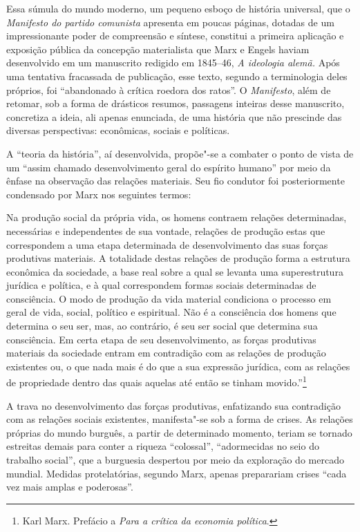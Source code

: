 Essa súmula do mundo moderno, um pequeno esboço de história universal,
que o \textit{Manifesto do partido comunista} apresenta em poucas
páginas, dotadas de um impressionante poder de compreensão e síntese,
constitui a primeira aplicação e exposição pública da concepção
materialista que Marx e Engels haviam desenvolvido em um manuscrito
redigido em 1845--46, \textit{A ideologia alemã.} Após uma tentativa
fracassada de publicação, esse texto, segundo a terminologia deles
próprios, foi “abandonado à crítica roedora dos ratos”. O
\textit{Manifesto}, além de retomar, sob a forma de drásticos resumos,
passagens inteiras desse manuscrito, concretiza a ideia, ali apenas
enunciada, de uma história que não prescinde das diversas perspectivas:
econômicas, sociais e políticas.

A “teoria da história”, aí desenvolvida, propõe"-se a combater o ponto
de vista de um “assim chamado desenvolvimento geral do espírito humano”
por meio da ênfase na observação das relações materiais. Seu fio
condutor foi posteriormente condensado por Marx nos seguintes termos: 

\begin{hedraquote} 
Na produção social da própria vida, os homens contraem relações
determinadas, necessárias e independentes de sua vontade, relações de
produção estas que correspondem a uma etapa determinada de
desenvolvimento das suas forças produtivas materiais. A totalidade
destas relações de produção forma a estrutura econômica da sociedade, a
base real sobre a qual se levanta uma superestrutura jurídica e
política, e à qual correspondem formas sociais determinadas de
consciência. O modo de produção da vida material condiciona o processo
em geral de vida, social, político e espiritual. Não é a consciência
dos homens que determina o seu ser, mas, ao contrário, é seu ser social
que determina sua consciência. Em certa etapa de seu desenvolvimento,
as forças produtivas materiais da sociedade entram em contradição com
as relações de produção existentes  ou, o que nada mais é do que a sua
expressão jurídica, com as relações de propriedade dentro das quais
aquelas até então se tinham movido.”\footnote{ Karl Marx. Prefácio a
\textit{Para a crítica da economia política}.}
\end{hedraquote} 

A trava no desenvolvimento das forças produtivas, enfatizando sua
contradição com as relações sociais existentes, manifesta"-se sob a
forma de crises. As relações próprias do mundo burguês, a partir de
determinado momento, teriam se tornado estreitas demais para
conter a riqueza “colossal”, “adormecidas no seio do trabalho social”,
que a burguesia despertou por meio da exploração do mercado mundial.
Medidas protelatórias, segundo Marx, apenas preparariam crises “cada
vez mais amplas e poderosas”.

